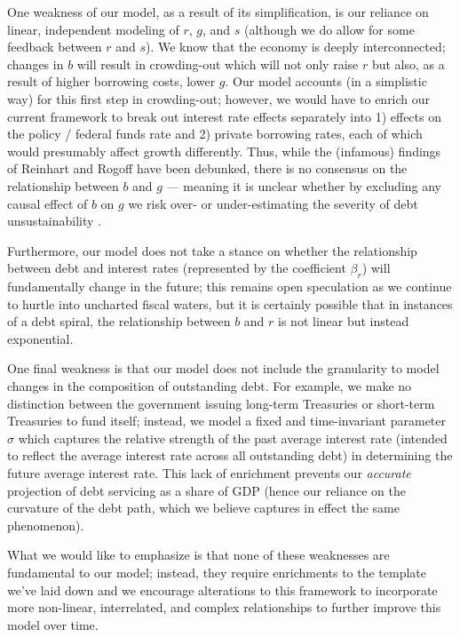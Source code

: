 \documentclass[12pt]{article}
\begin{document}
One weakness of our model, as a result of its simplification, is our reliance on linear, independent modeling of $r$, $g$, and $s$ (although we do allow for some feedback between $r$ and $s$). We know that the economy is deeply interconnected; changes in $b$ will result in crowding-out which will not only raise $r$ but also, as a result of higher borrowing costs, lower $g$. Our model accounts (in a simplistic way) for this first step in crowding-out; however, we would have to  enrich our current framework to break out interest rate effects separately into 1) effects on the policy / federal funds rate and 2) private borrowing rates, each of which would presumably affect growth differently. Thus, while the (infamous) findings of Reinhart and Rogoff have been debunked, there is no consensus on the relationship between $b$ and $g$ --- meaning it is unclear whether by excluding any causal effect of $b$ on $g$ we risk over- or under-estimating the severity of debt unsustainability \parencite{rahman2019does}.

Furthermore, our model does not take a stance on whether the relationship between debt and interest rates (represented by the coefficient $\beta_r$) will fundamentally change in the future; this remains open speculation as we continue to hurtle into uncharted fiscal waters, but it is certainly possible that in instances of a debt spiral, the relationship between $b$ and $r$ is not linear but instead exponential. 

One final weakness is that our model does not include the granularity to model changes in the composition of outstanding debt. For example, we make no distinction between the government issuing long-term Treasuries or short-term Treasuries to fund itself; instead, we model a fixed and time-invariant parameter $\sigma$ which captures the relative strength of the past average interest rate (intended to reflect the average interest rate across all outstanding debt) in determining the future average interest rate. This lack of enrichment prevents our \textit{accurate} projection of debt servicing as a share of GDP (hence our reliance on the curvature of the debt path, which we believe captures in effect the same phenomenon).

What we would like to emphasize is that none of these weaknesses are fundamental to our model; instead, they require enrichments to the template we've laid down and we encourage alterations to this framework to incorporate more non-linear, interrelated, and complex relationships to further improve this model over time.
\end{document}
